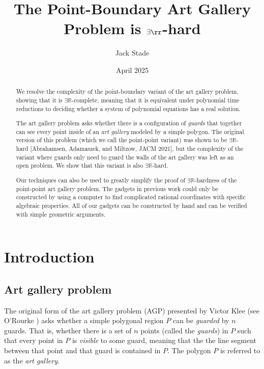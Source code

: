 \documentclass[11pt]{article}
\title{The Point-Boundary Art Gallery Problem is $\exists\rr$-hard}
\date{April 2025}
\author[1]{Jack Stade}
\affil[1]{University of Copenhagen, Denmark}
\theoremstyle{plain}
\theoremstyle{definition}
\numberwithin{theorem}{section}
\begin{document}
\maketitle
\begin{abstract}
    We resolve the complexity of the point-boundary variant of the art gallery problem, showing that it is $\exists\mathbb{R}$-complete, meaning that it is equivalent under polynomial time reductions to deciding whether a system of polynomial equations has a real solution. 

    The art gallery problem asks whether there is a configuration of {\it guards} that together can see every point inside of an {\it art gallery} modeled by a simple polygon. The original version of this problem (which we call the point-point variant) was shown to be $\exists\mathbb{R}$-hard [Abrahamsen, Adamaszek, and Miltzow, JACM 2021], but the complexity of the variant where guards only need to guard the walls of the art gallery was left as an open problem. We show that this variant is also $\exists\mathbb{R}$-hard.

    Our techniques can also be used to greatly simplify the proof of $\exists\mathbb{R}$-hardness of the point-point art gallery problem. The gadgets in previous work could only be constructed by using a computer to find complicated rational coordinates with specific algebraic properties. All of our gadgets can be constructed by hand and can be verified with simple geometric arguments. 
\end{abstract}

\tableofcontents

\newpage

\section{Introduction}
\subsection{Art gallery problem}
The original form of the art gallery problem (AGP) presented by Victor Klee (see O'Rourke \cite{ArtGalleryTextbook}) asks whether a simple polygonal region $P$ can be \emph{guarded} by $n$ guards. That is, whether there is a set of $n$ points (called the \emph{guards}) in $P$ such that every point in $P$ is \emph{visible} to some guard, meaning that the the line segment between that point and that guard is contained in $P$. The polygon $P$ is referred to as the \emph{art gallery}. 
\end{document}
